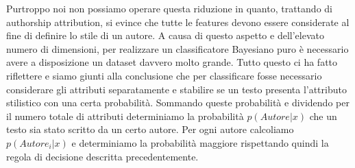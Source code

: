 \documentclass[titlepage]{article}
\begin{document}
\noindent
Purtroppo noi non possiamo operare questa riduzione in quanto, trattando di authorship attribution, si evince che tutte le features devono essere considerate al fine di definire lo stile di un autore. A causa di questo aspetto e dell'elevato numero di dimensioni, per realizzare un classificatore Bayesiano puro è necessario avere a disposizione un dataset davvero molto grande. Tutto questo ci ha fatto riflettere e siamo giunti alla conclusione che per classificare fosse necessario considerare gli attributi separatamente e stabilire se un testo presenta l'attributo stilistico con una certa probabilità. Sommando queste probabilità e dividendo per il numero totale di attributi determiniamo la probabilità $p(Autore | x)$ che un testo sia stato scritto da un certo autore. Per ogni autore calcoliamo $p(Autore_i | x)$ e determiniamo la probabilità maggiore rispettando quindi la regola di decisione descritta precedentemente.
\end{document}
